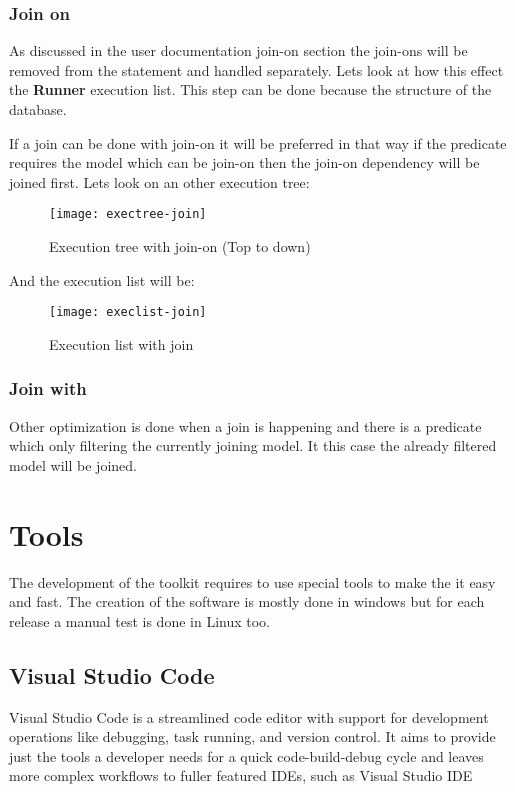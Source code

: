 \newpage
\subsubsection{Join on}
As discussed in the user documentation join-on section the join-ons will be removed from the statement and handled separately. Lets look at how this effect the \textbf{Runner} execution list. This step can be done because the structure of the database.

If a join can be done with join-on it will be preferred in that way if the predicate requires the model which can be join-on then the join-on dependency will be joined first. Lets look on an other execution tree:

 \begin{figure}[H]
	\centering
	\texttt{[image: exectree-join]}
	\caption{Execution tree with join-on (Top to down)}
	\label{fig:fig-tree}
\end{figure}

And the execution list will be:

\begin{figure}[H]
	\centering
	\texttt{[image: execlist-join]}
	\caption{Execution list with join}
	\label{fig:fig-joine}
\end{figure}

\subsubsection{Join with}

Other optimization is done when a join is happening and there is a predicate which only filtering the currently joining model. It this case the already filtered model will be joined.

\section{Tools}

The development of the toolkit requires to use special tools to make the it easy and fast. The creation of the software is mostly done in windows but for each release a manual test is done in Linux too.

\subsection{Visual Studio Code}

Visual Studio Code is a streamlined code editor with support for development operations like debugging, task running, and version control. It aims to provide just the tools a developer needs for a quick code-build-debug cycle and leaves more complex workflows to fuller featured IDEs, such as Visual Studio IDE\cite{vscode}

